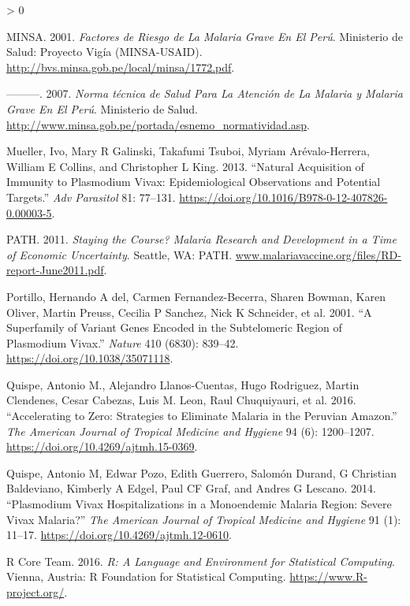 \documentclass[
  a4paper]{article}
\newlength{\cslhangindent}
\newenvironment{CSLReferences}[2] %
 {%
  \setlength{\parindent}{0pt}
  \ifodd #1 \everypar{\setlength{\hangindent}{\cslhangindent}}\ignorespaces\fi
  \ifnum #2 > 0
  \setlength{\parskip}{#2\baselineskip}
  \fi
 }%
 {}
\begin{document}
\begin{CSLReferences}{1}{0}
\leavevmode\hypertarget{ref-factores2001}{}%
MINSA. 2001. \emph{Factores de Riesgo de La Malaria Grave En El Per{ú}}.
{Ministerio de Salud}: Proyecto Vig{í}a (MINSA-USAID).
\url{http://bvs.minsa.gob.pe/local/minsa/1772.pdf}.

\leavevmode\hypertarget{ref-norma2001}{}%
---------. 2007. \emph{Norma técnica de Salud Para La Atención de La
Malaria y Malaria Grave En El Per{ú}}. {Ministerio de Salud}.
\url{http://www.minsa.gob.pe/portada/esnemo_normatividad.asp}.

\leavevmode\hypertarget{ref-mueller2013}{}%
Mueller, Ivo, Mary R Galinski, Takafumi Tsuboi, Myriam Arévalo-Herrera,
William E Collins, and Christopher L King. 2013. {``Natural Acquisition
of Immunity to Plasmodium Vivax: Epidemiological Observations and
Potential Targets.''} \emph{Adv Parasitol} 81: 77--131.
\url{https://doi.org/10.1016/B978-0-12-407826-0.00003-5}.

\leavevmode\hypertarget{ref-path2011}{}%
PATH. 2011. \emph{Staying the Course? Malaria Research and Development
in a Time of Economic Uncertainty}. Seattle, WA: PATH.
\href{https://www.malariavaccine.org/files/RD-report-June2011.pdf}{www.malariavaccine.org/files/RD-report-June2011.pdf}.

\leavevmode\hypertarget{ref-portillo2001vir}{}%
Portillo, Hernando A del, Carmen Fernandez-Becerra, Sharen Bowman, Karen
Oliver, Martin Preuss, Cecilia P Sanchez, Nick K Schneider, et al. 2001.
{``A Superfamily of Variant Genes Encoded in the Subtelomeric Region of
Plasmodium Vivax.''} \emph{Nature} 410 (6830): 839--42.
\url{https://doi.org/10.1038/35071118}.

\leavevmode\hypertarget{ref-accelerate2016}{}%
Quispe, Antonio M., Alejandro Llanos-Cuentas, Hugo Rodriguez, Martin
Clendenes, Cesar Cabezas, Luis M. Leon, Raul Chuquiyauri, et al. 2016.
{``Accelerating to Zero: Strategies to Eliminate Malaria in the
{Peruvian Amazon}.''} \emph{The American Journal of Tropical Medicine
and Hygiene} 94 (6): 1200--1207.
\url{https://doi.org/10.4269/ajtmh.15-0369}.

\leavevmode\hypertarget{ref-quispe2014}{}%
Quispe, Antonio M, Edwar Pozo, Edith Guerrero, Salomón Durand, G
Christian Baldeviano, Kimberly A Edgel, Paul CF Graf, and Andres G
Lescano. 2014. {``Plasmodium Vivax Hospitalizations in a Monoendemic
Malaria Region: Severe Vivax Malaria?''} \emph{The American Journal of
Tropical Medicine and Hygiene} 91 (1): 11--17.
\url{https://doi.org/10.4269/ajtmh.12-0610}.

\leavevmode\hypertarget{ref-R2016}{}%
R Core Team. 2016. \emph{R: A Language and Environment for Statistical
Computing}. Vienna, Austria: R Foundation for Statistical Computing.
\url{https://www.R-project.org/}.


\end{CSLReferences}
\end{document}
